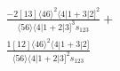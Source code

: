 \documentclass[varwidth, border=5pt]{standalone}
\begin{document}
\begin{my}
$\begin{gathered}
\scriptscriptstyle\frac{-2[13]⟨46⟩^2⟨4|1+3|2]^2}{⟨56⟩⟨4|1+2|3]^3s_{123}}+\\
\scriptscriptstyle\frac{1[12]⟨46⟩^2⟨4|1+3|2]}{⟨56⟩⟨4|1+2|3]^2s_{123}}\phantom{+}
\end{gathered}$
\end{my}
\end{document}
